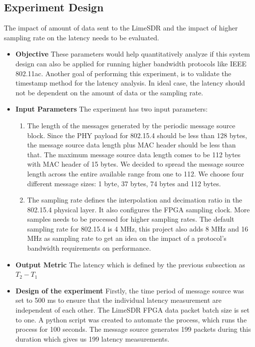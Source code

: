 \subsection{Experiment Design} \label{exp1}
The impact of amount of data sent to the LimeSDR and the impact of higher sampling rate on the latency needs to be evaluated.
\begin{itemize}
    \item {\textbf{Objective} These parameters would help quantitatively analyze if this system design can also be applied for running higher bandwidth protocols like IEEE 802.11ac.
Another goal of performing this experiment, is to validate the timestamp method for the latency analysis.
In ideal case, the latency should not be dependent on the amount of data or the sampling rate.}
\item{\textbf{Input Parameters} The experiment has two input parameters:
\begin{enumerate}
    \item {The length of the messages generated by the periodic message source block.
    Since the PHY payload for 802.15.4 should be less than 128 bytes, the message source data length plus MAC header should be less than that.
    The maximum message source data length comes to be 112 bytes with MAC header of 15 bytes.
    We decided to spread the message source length across the entire available range from one to 112.
    We choose four different message sizes: 1 byte, 37 bytes, 74 bytes and 112 bytes.}
    \item {The sampling rate defines the interpolation and decimation ratio in the 802.15.4 physical layer.
    It also configures the FPGA sampling clock.
    More samples needs to be processed for higher sampling rates.
    The default sampling rate for 802.15.4 is 4 MHz, this project also adds 8 MHz and 16 MHz as sampling rate to get an idea on the impact of a protocol's bandwidth requirements on performance.
    }
\end{enumerate}
}
\item{\textbf{Output Metric} The latency which is defined by the previous subsection as $T_2 - T_1$}
\item{\textbf{Design of the experiment} Firstly, the time period of message source was set to 500 ms to ensure that the individual latency measurement are independent of each other.
The LimeSDR FPGA data packet batch size is set to one.
A python script was created to automate the process, which runs the process for 100 seconds.
The message source generates 199 packets during this duration which gives us 199 latency measurements.
}
\end{itemize}


